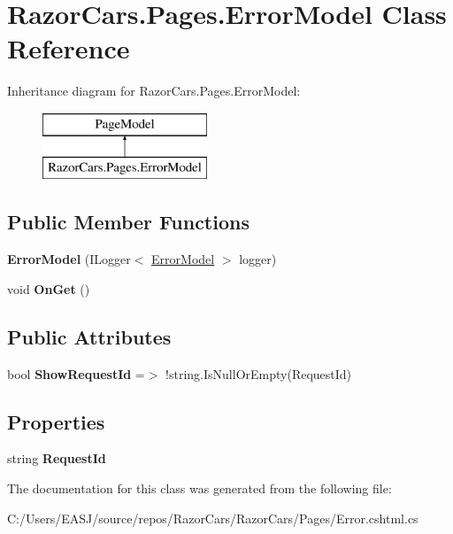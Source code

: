 \hypertarget{class_razor_cars_1_1_pages_1_1_error_model}{}\section{Razor\+Cars.\+Pages.\+Error\+Model Class Reference}
\label{class_razor_cars_1_1_pages_1_1_error_model}
Inheritance diagram for Razor\+Cars.\+Pages.\+Error\+Model\+:\begin{figure}[H]
\begin{center}
\leavevmode
\includegraphics[height=2.000000cm]{class_razor_cars_1_1_pages_1_1_error_model}
\end{center}
\end{figure}
\subsection*{Public Member Functions}
\begin{DoxyCompactItemize}
\item 
\mbox{\label{class_razor_cars_1_1_pages_1_1_error_model_a5deb4dfb9a27abece319368a68879e4f}} 
{\bfseries Error\+Model} (I\+Logger$<$ \mbox{\hyperlink{class_razor_cars_1_1_pages_1_1_error_model}{Error\+Model}} $>$ logger)
\item 
\mbox{\label{class_razor_cars_1_1_pages_1_1_error_model_aebd689fb146e1473da7fc52815b5cf65}} 
void {\bfseries On\+Get} ()
\end{DoxyCompactItemize}
\subsection*{Public Attributes}
\begin{DoxyCompactItemize}
\item 
\mbox{\label{class_razor_cars_1_1_pages_1_1_error_model_a578c0aae2508cbf1d1ea2083521dc533}} 
bool {\bfseries Show\+Request\+Id} =$>$ !string.\+Is\+Null\+Or\+Empty(Request\+Id)
\end{DoxyCompactItemize}
\subsection*{Properties}
\begin{DoxyCompactItemize}
\item 
\mbox{\label{class_razor_cars_1_1_pages_1_1_error_model_ae7cdb61fcc06cb387f70ecfe177a1ae9}} 
string {\bfseries Request\+Id}
\end{DoxyCompactItemize}


The documentation for this class was generated from the following file\+:\begin{DoxyCompactItemize}
\item 
C\+:/\+Users/\+E\+A\+S\+J/source/repos/\+Razor\+Cars/\+Razor\+Cars/\+Pages/Error.\+cshtml.\+cs\end{DoxyCompactItemize}
